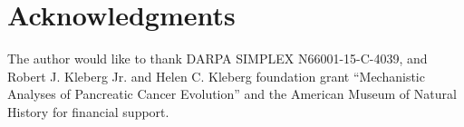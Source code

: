 \documentclass[12pt]{article}
\begin{document}
\section*{Acknowledgments}
The author would like to thank DARPA SIMPLEX N66001-15-C-4039, and Robert J. Kleberg Jr. and Helen C. Kleberg foundation grant ``Mechanistic Analyses of Pancreatic Cancer Evolution'' and the American Museum of Natural History for financial support. 

%
%
\newpage
%

%
\end{document}
